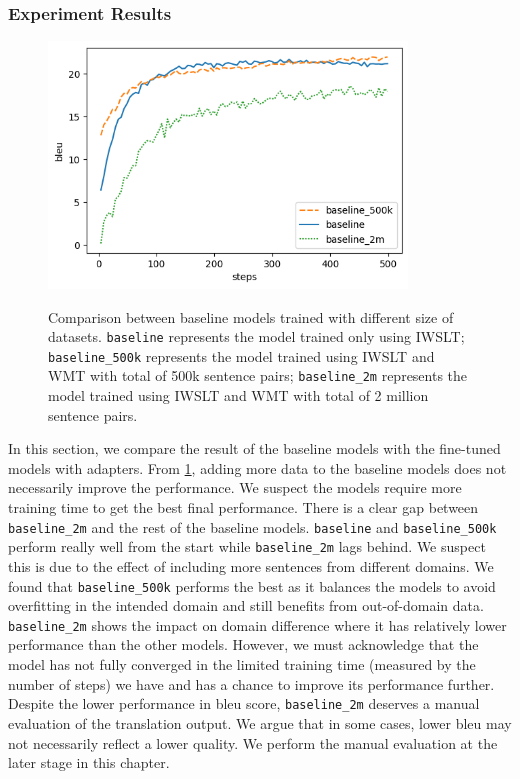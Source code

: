\subsubsection{Experiment Results}
\begin{figure}[h]
    {\includegraphics[width=0.85\textwidth]{img/baseline.png}}
    \centering
    \caption[Comparison between baseline models trained with different size of datasets.]{
        Comparison between baseline models trained with different size of datasets. \texttt{baseline} represents the model trained only using IWSLT; \texttt{baseline\_500k} represents the model trained using IWSLT and WMT with total of 500k sentence pairs; \texttt{baseline\_2m} represents the model trained using IWSLT and WMT with total of 2 million sentence pairs.}
    \label{img:basecomp}
\end{figure}

In this section, we compare the result of the baseline models with the fine-tuned models with adapters. From \cref{img:basecomp}, adding more data to the baseline models does not necessarily improve the performance. We suspect the models require more training time to get the best final performance. There is a clear gap between \texttt{baseline\_2m} and the rest of the baseline models. \texttt{baseline} and \texttt{baseline\_500k} perform really well from the start while \texttt{baseline\_2m} lags behind. We suspect this is due to the effect of including more sentences from different domains. We found that \texttt{baseline\_500k} performs the best as it balances the models to avoid overfitting in the intended domain and still benefits from out-of-domain data. \texttt{baseline\_2m} shows the impact on domain difference where it has relatively lower performance than the other models. However, we must acknowledge that the model has not fully converged in the limited training time (measured by the number of steps) we have and has a chance to improve its performance further. Despite the lower performance in bleu score, \texttt{baseline\_2m} deserves a manual evaluation of the translation output. We argue that in some cases, lower bleu may not necessarily reflect a lower quality. We perform the manual evaluation at the later stage in this chapter.

